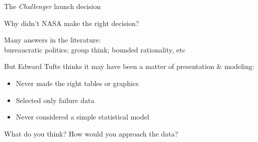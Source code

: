 \documentclass[11pt]{beamer}
\begin{document}
\begin{frame} {The \emph{Challenger} launch decision}

Why didn't NASA make the right decision? \pause

Many answers in the literature:  \\
bureaucratic politics; group think; bounded rationality, etc \pause

But Edward Tufte thinks it may have been a matter of presentation \& modeling: \pause

\begin{itemize}
\item Never made the right tables or graphics

\item Selected only failure data

\item Never considered a simple statistical model
\end{itemize}
What do you think?  How would you approach the data?

\end{frame}

\end{document}
